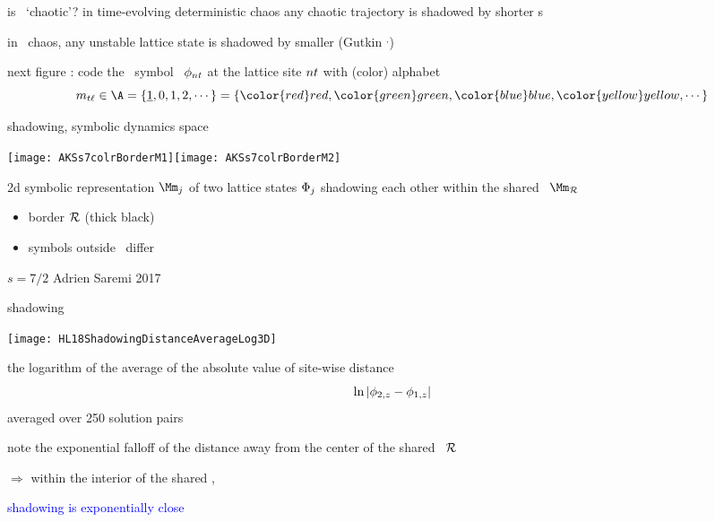 \begin{frame}{is \catlatt\ `chaotic'?}
in time-evolving deterministic chaos any chaotic trajectory is
{\color{blue}shadowed by shorter \po s}
\bigskip

in \spt\ chaos, any unstable lattice state is {\color{blue}shadowed by
smaller \twots}
(Gutkin \etal{}${}^{,}${})

\vfill

next figure : code the \Mm\ symbol \brick\  $\phi_{nt}$ at the
lattice site $nt$ with (color) alphabet
\[
\Ssym{t\ell} \in \A=\{\underline{1},0,1,2,\cdots\}=
\{%
{\color{red}red},
{\color{green}green},
{\color{blue}blue},
{\color{yellow}yellow},\cdots%
\}
\]

\end{frame} %

\begin{frame}{shadowing, symbolic dynamics space}
\begin{center}
\texttt{[image: AKSs7colrBorderM1]}\hspace{0.7cm}\texttt{[image: AKSs7colrBorderM2]}
\end{center}
2d symbolic representation $\Mm_j$ of two lattice states $\Phi_j$
shadowing each other within the shared
\brick\ $\Mm_{\R}$ %

\begin{itemize}
  \item border $\mathcal{R}$ (thick black) %
  \item symbols outside \R\ differ
\end{itemize}
\vfill
$s=7/2$    \hfill                          Adrien Saremi 2017
\end{frame} %

\begin{frame}{shadowing} %
\begin{center}
\texttt{[image: HL18ShadowingDistanceAverageLog3D]}
\end{center}

\bigskip

the logarithm of the average of the absolute value of site-wise distance
\[
\ln|\phi_{2,z}-\phi_{1,z}|
\]
averaged over 250 solution pairs
\medskip

note the exponential falloff of the distance away from the center of the
shared \brick\ $\mathcal{R}$ %
\medskip

$\Rightarrow$ within the interior of the shared \brick,

\hfill \textcolor{blue}{shadowing is exponentially close}
\end{frame} %

